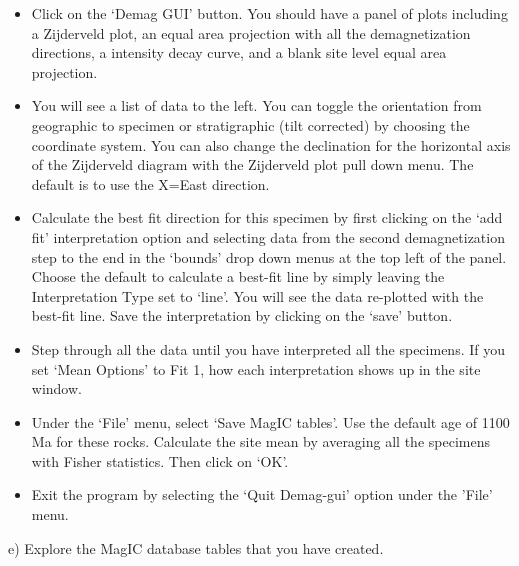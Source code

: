 {\begin{itemize}
\item Click on the 	`Demag GUI' button.  You should have a panel of plots including a  Zijderveld plot, an equal area projection with all the demagnetization directions, a intensity decay curve, and a blank site level equal area projection.    
\item You will see a list of data to the left.   You can toggle the orientation from geographic to specimen or stratigraphic (tilt corrected) by choosing the coordinate system.   You can also change the declination for the horizontal axis of the Zijderveld diagram with the Zijderveld plot pull down menu.  The default is to use the X=East direction.    
\item  Calculate the best fit direction for this specimen by first clicking on the `add fit' interpretation option and selecting data from the second demagnetization step to the end in the `bounds' drop down menus at the top left of the panel.   Choose the default to calculate a best-fit line by simply leaving the Interpretation Type set to  `line'.    You will see the data re-plotted with the best-fit line.   Save the interpretation by clicking on the `save' button.  
\item Step through all the data until you have interpreted all the specimens.   If you set `Mean Options' to Fit 1,  how each interpretation shows up in the site window.  
\item  Under the `File' menu, select `Save MagIC  tables'.  Use the default age of 1100 Ma for these rocks.  Calculate the site mean by averaging all the specimens with Fisher statistics.   Then click on `OK'. 
\item Exit the program by  selecting the `Quit Demag-gui' option under the 'File' menu.  
\end{itemize}


e) Explore the MagIC database tables that you have created. 

}
